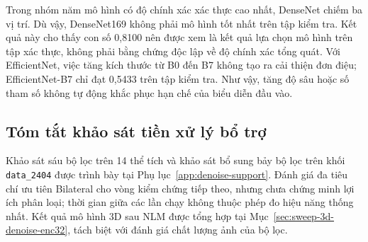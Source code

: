 \documentclass[14pt,a4paper,oneside]{extreport}
\begin{document}
Trong nhóm năm mô hình có độ chính xác xác thực cao nhất, DenseNet chiếm ba vị
trí. Dù vậy, DenseNet169 không phải mô hình tốt nhất trên tập kiểm tra. Kết quả
này cho thấy con số 0,8100 nên được xem là kết quả lựa chọn mô hình trên tập xác
thực, không phải bằng chứng độc lập về độ chính xác tổng quát. Với EfficientNet,
việc tăng kích thước từ B0 đến B7 không tạo ra cải thiện đơn điệu; EfficientNet-B7
chỉ đạt 0,5433 trên tập kiểm tra. Như vậy, tăng độ sâu hoặc số tham số không tự
động khắc phục hạn chế của biểu diễn đầu vào.

%
%
%
%
%

\subsection{Tóm tắt khảo sát tiền xử lý bổ trợ}
Khảo sát sáu bộ lọc trên 14 thể tích và khảo sát bổ sung bảy bộ lọc
trên khối \texttt{data\_2404} được trình bày tại
Phụ lục~\ref{app:denoise-support}. Đánh giá đa tiêu chí ưu tiên
Bilateral cho vòng kiểm chứng tiếp theo, nhưng chưa chứng minh
lợi ích phân loại; thời gian giữa các lần chạy không thuộc phép đo hiệu năng
thống nhất. Kết quả mô hình 3D sau NLM được tổng hợp tại
Mục~\ref{sec:sweep-3d-denoise-enc32}, tách biệt với đánh giá chất
lượng ảnh của bộ lọc.
\end{document}
